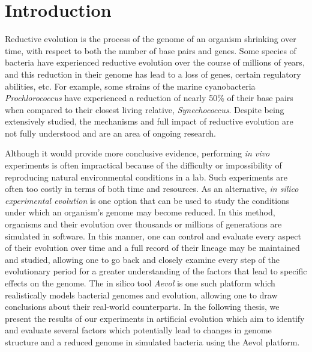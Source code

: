 \chapter{Introduction}\label{ch:intro}
Reductive evolution is the process of the genome of an organism shrinking over time, with respect to both the number of base pairs and genes. Some species of bacteria have experienced reductive evolution over the course of millions of years, and this reduction in their genome has lead to a loss of genes, certain regulatory abilities, etc. For example, some strains of the marine cyanobacteria \textit{Prochlorococcus} have experienced a reduction of nearly 50\% of their base pairs when compared to their closest living relative, \textit{Synechococcus}. Despite being extensively studied, the mechanisms and full impact of reductive evolution are not fully understood and are an area of ongoing research. 

Although it would provide more conclusive evidence, performing \textit{in vivo} experiments is often impractical because of the difficulty or impossibility of reproducing natural environmental conditions in a lab. Such experiments are often too costly in terms of both time and resources. As an alternative, \textit{in silico experimental evolution} is one option that can be used to study the conditions under which an organism's genome may become reduced. In this method, organisms and their evolution over thousands or millions of generations are simulated in software. In this manner, one can control and evaluate every aspect of their evolution over time and a full record of their lineage may be maintained and studied, allowing one to go back and closely examine every step of the evolutionary period for a greater understanding of the factors that lead to specific effects on the genome. The in silico tool \textit{Aevol} is one such platform which realistically models bacterial genomes and evolution, allowing one to draw conclusions about their real-world counterparts. In the following thesis, we present the results of our experiments in artificial evolution which aim to identify and evaluate several factors which potentially lead to changes in genome structure and a reduced genome in simulated bacteria using the Aevol platform. 

